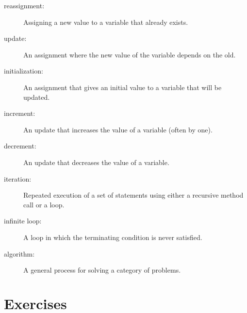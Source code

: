\documentclass[10pt]{book}
\begin{document}
\begin{description}

\item[reassignment:] Assigning a new value to a variable that
already exists.

\item[update:] An assignment where the new value of the variable
depends on the old.

\item[initialization:] An assignment that gives an initial value to
a variable that will be updated.

\item[increment:] An update that increases the value of a variable
(often by one).

\item[decrement:] An update that decreases the value of a variable.

\item[iteration:] Repeated execution of a set of statements using
either a recursive method call or a loop.

\item[infinite loop:] A loop in which the terminating condition is
never satisfied.

\item[algorithm:]  A general process for solving a category of
problems.

\end{description}


\section{Exercises}
\end{document}
